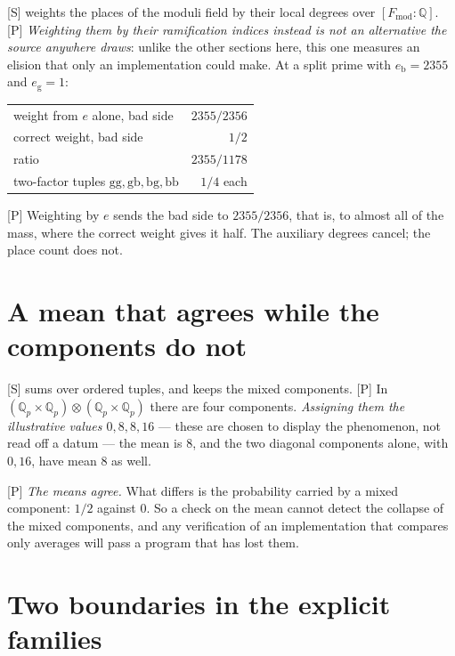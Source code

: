 \documentclass[11pt]{article}
\theoremstyle{plain}
\theoremstyle{definition}
\newcommand{\Fmod}{F_{\mathrm{mod}}}
\begin{document}
\textup{[S]} \cite[Rem.~1.7.1]{IUT4} weights the places of the moduli field by their
local degrees over $[\Fmod:\mathbb{Q}]$.  \textup{[P]} \emph{Weighting them by their
ramification indices instead is not an alternative the source anywhere draws}: unlike
the other sections here, this one measures an elision that only an implementation could
make.  At a split prime with $e_{\mathrm b}=2355$ and $e_{\mathrm g}=1$:

\begin{center}
\begin{tabular}{lr}
\toprule
weight from $e$ alone, bad side & $2355/2356$\\
correct weight, bad side & $1/2$\\
ratio & $2355/1178$\\
\midrule
two-factor tuples $\mathrm{gg},\mathrm{gb},\mathrm{bg},\mathrm{bb}$ & $1/4$ each\\
\bottomrule
\end{tabular}
\end{center}

\textup{[P]} Weighting by $e$ sends the bad side to $2355/2356$, that is, to almost all
of the mass, where the correct weight gives it half.  The auxiliary degrees cancel; the
place count does not.

\section{A mean that agrees while the components do not}\label{s:mean}

\textup{[S]} \cite[Prop.~1.7]{IUT4} sums over ordered tuples, and
\cite[Rem.~1.10.7(ii)]{IUT4} keeps the mixed components.  \textup{[P]} In
$(\mathbb{Q}_p\times\mathbb{Q}_p)\otimes(\mathbb{Q}_p\times\mathbb{Q}_p)$ there are four
components.  \emph{Assigning them the illustrative values $0,8,8,16$} --- these are
chosen to display the phenomenon, not read off a datum --- the mean is $8$, and the two
diagonal components alone, with $0,16$, have mean $8$ as well.

\textup{[P]} \emph{The means agree.} What differs is the probability carried by a mixed
component: $1/2$ against $0$.  So a check on the mean cannot detect the collapse of the
mixed components, and any verification of an implementation that compares only averages
will pass a program that has lost them.

\section{Two boundaries in the explicit families}\label{s:bdry}
\end{document}
